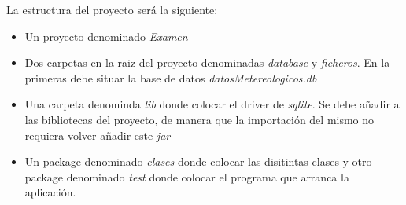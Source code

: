 \documentclass[addpoints,12pt]{exam}
\begin{document}
\begin{center}
\end{center}
\vspace{0.1in}
La estructura del proyecto será la siguiente:
\begin{itemize}
\item Un proyecto denominado \emph{Examen}
\item Dos carpetas en la raiz del proyecto denominadas \emph{database} y \emph{ficheros}. En la primeras debe situar la base de datos \emph{datosMetereologicos.db}
\item Una carpeta denominda \emph{lib} donde colocar el driver de \emph{sqlite}. Se debe añadir a las bibliotecas del proyecto, de manera que la importación del mismo no requiera volver añadir este \emph{jar}
\item Un package denominado \emph{clases} donde colocar las disitintas clases y otro package denominado \emph{test} donde colocar el programa que arranca la aplicación.
\end{itemize}
\end{document}
